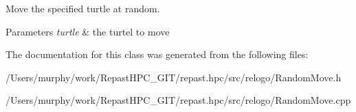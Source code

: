 Move the specified turtle at random. 


\begin{DoxyParams}{Parameters}
{\em turtle} & the turtel to move \\
\hline
\end{DoxyParams}


The documentation for this class was generated from the following files\-:\begin{DoxyCompactItemize}
\item 
/\-Users/murphy/work/\-Repast\-H\-P\-C\-\_\-\-G\-I\-T/repast.\-hpc/src/relogo/Random\-Move.\-h\item 
/\-Users/murphy/work/\-Repast\-H\-P\-C\-\_\-\-G\-I\-T/repast.\-hpc/src/relogo/Random\-Move.\-cpp\end{DoxyCompactItemize}
